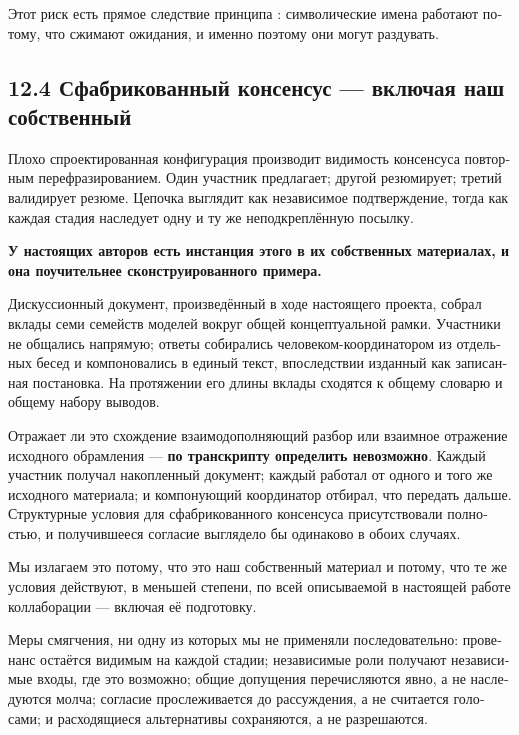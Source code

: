\begin{russian}
Этот риск есть прямое следствие принципа : символические имена работают потому, что сжимают ожидания, и именно поэтому они могут раздувать.


\subsection*{12.4 Сфабрикованный консенсус — включая наш собственный}
\label{sec:ru:12.4}

Плохо спроектированная конфигурация производит видимость консенсуса повторным перефразированием. Один участник предлагает; другой резюмирует; третий валидирует резюме. Цепочка выглядит как независимое подтверждение, тогда как каждая стадия наследует одну и ту же неподкреплённую посылку.

\textbf{У настоящих авторов есть инстанция этого в их собственных материалах, и она поучительнее сконструированного примера.}

Дискуссионный документ, произведённый в ходе настоящего проекта, собрал вклады семи семейств моделей вокруг общей концептуальной рамки. Участники не общались напрямую; ответы собирались человеком-координатором из отдельных бесед и компоновались в единый текст, впоследствии изданный как записанная постановка. На протяжении его длины вклады сходятся к общему словарю и общему набору выводов.

Отражает ли это схождение взаимодополняющий разбор или взаимное отражение исходного обрамления — \textbf{по транскрипту определить невозможно}. Каждый участник получал накопленный документ; каждый работал от одного и того же исходного материала; и компонующий координатор отбирал, что передать дальше. Структурные условия для сфабрикованного консенсуса присутствовали полностью, и получившееся согласие выглядело бы одинаково в обоих случаях.

Мы излагаем это потому, что это наш собственный материал и потому, что те же условия действуют, в меньшей степени, по всей описываемой в настоящей работе коллаборации — включая её подготовку.

Меры смягчения, ни одну из которых мы не применяли последовательно: провенанс остаётся видимым на каждой стадии; независимые роли получают независимые входы, где это возможно; общие допущения перечисляются явно, а не наследуются молча; согласие прослеживается до рассуждения, а не считается голосами; и расходящиеся альтернативы сохраняются, а не разрешаются.



\end{russian}
